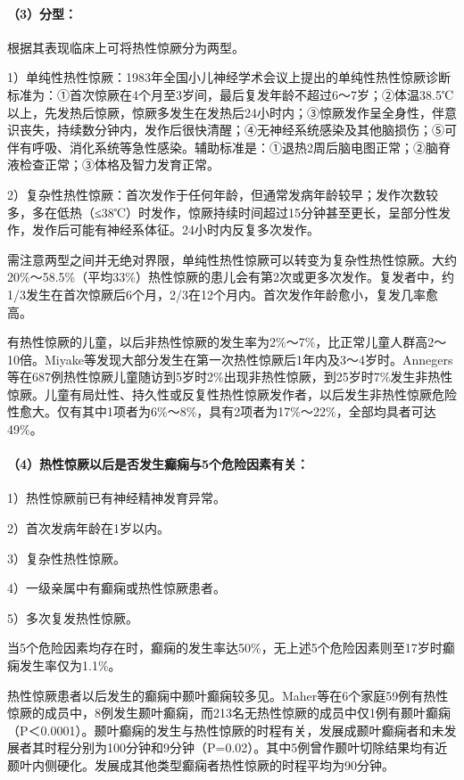 \paragraph{（3）分型：}

根据其表现临床上可将热性惊厥分为两型。

1）单纯性热性惊厥：1983年全国小儿神经学术会议上提出的单纯性热性惊厥诊断标准为：①首次惊厥在4个月至3岁间，最后复发年龄不超过6～7岁；②体温38.5℃以上，先发热后惊厥，惊厥多发生在发热后24小时内；③惊厥发作呈全身性，伴意识丧失，持续数分钟内，发作后很快清醒；④无神经系统感染及其他脑损伤；⑤可伴有呼吸、消化系统等急性感染。辅助标准是：①退热2周后脑电图正常；②脑脊液检查正常；③体格及智力发育正常。

2）复杂性热性惊厥：首次发作于任何年龄，但通常发病年龄较早；发作次数较多，多在低热（≤38℃）时发作，惊厥持续时间超过15分钟甚至更长，呈部分性发作，发作后可能有神经系体征。24小时内反复多次发作。

需注意两型之间并无绝对界限，单纯性热性惊厥可以转变为复杂性热性惊厥。大约20\%～58.5\%（平均33\%）热性惊厥的患儿会有第2次或更多次发作。复发者中，约1/3发生在首次惊厥后6个月，2/3在12个月内。首次发作年龄愈小，复发几率愈高。

有热性惊厥的儿童，以后非热性惊厥的发生率为2\%～7\%，比正常儿童人群高2～10倍。Miyake等发现大部分发生在第一次热性惊厥后1年内及3～4岁时。Annegers等在687例热性惊厥儿童随访到5岁时2\%出现非热性惊厥，到25岁时7\%发生非热性惊厥。儿童有局灶性、持久性或反复性热性惊厥发作者，以后发生非热性惊厥危险性愈大。仅有其中1项者为6\%～8\%，具有2项者为17\%～22\%，全部均具者可达49\%。

\paragraph{（4）热性惊厥以后是否发生癫痫与5个危险因素有关：}

1）热性惊厥前已有神经精神发育异常。

2）首次发病年龄在1岁以内。

3）复杂性热性惊厥。

4）一级亲属中有癫痫或热性惊厥患者。

5）多次复发热性惊厥。

当5个危险因素均存在时，癫痫的发生率达50\%，无上述5个危险因素则至17岁时癫痫发生率仅为1.1\%。

热性惊厥患者以后发生的癫痫中颞叶癫痫较多见。Maher等在6个家庭59例有热性惊厥的成员中，8例发生颞叶癫痫，而213名无热性惊厥的成员中仅1例有颞叶癫痫（P＜0.0001）。颞叶癫痫的发生与热性惊厥的时程有关，发展成颞叶癫痫者和未发展者其时程分别为100分钟和9分钟（P=0.02）。其中5例曾作颞叶切除结果均有近颞叶内侧硬化。发展成其他类型癫痫者热性惊厥的时程平均为90分钟。


